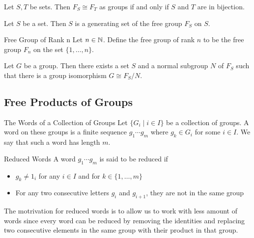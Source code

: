 \documentclass[a4paper]{article}
\begin{document}
\begin{prp}{}{} Let $S,T$ be sets. Then $F_S\cong F_T$ as groups if and only if $S$ and $T$ are in bijection. 
\end{prp}

\begin{lmm}{}{} Let $S$ be a set. Then $S$ is a generating set of the free group $F_S$ on $S$. 
\end{lmm}

\begin{defn}{Free Group of Rank n}{} Let $n\in\mathbb{N}$. Define the free group of rank $n$ to be the free group $F_n$ on the set $\{1,\dots,n\}$. 
\end{defn}

\begin{prp}{}{} Let $G$ be a group. Then there exists a set $S$ and a normal subgroup $N$ of $F_S$ such that there is a group isomorphism $G\cong F_S/N$. 
\end{prp}

\subsection{Free Products of Groups}
\begin{defn}{The Words of a Collection of Groups}{} Let $\{G_i\;|\;i\in I\}$ be a collection of groups. A word on these groups is a finite sequence $g_1\cdots g_m$ where $g_k\in G_i$ for some $i\in I$. We say that such a word has length $m$. 
\end{defn}

\begin{defn}{Reduced Words}{} A word $g_1\cdots g_m$ is said to be reduced if 
\begin{itemize}
\item $g_k\neq 1_i$ for any $i\in I$ and for $k\in\{1,\dots,m\}$
\item For any two consecutive letters $g_i$ and $g_{i+1}$, they are not in the same group
\end{itemize}
\end{defn}

The motrivation for reduced words is to allow us to work with less amount of words since every word can be reduced by removing the identities and replacing two consecutive elements in the same group with their product in that group. 
\end{document}
